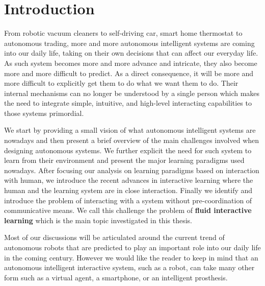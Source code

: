 
\chapter{Introduction}
\label{chapter:introduction}
\minitoc

From robotic vacuum cleaners to self-driving car, smart home thermostat to autonomous trading, more and more autonomous intelligent systems are coming into our daily life, taking on their own decisions that can affect our everyday life. As such system becomes more and more advance and intricate, they also become more and more difficult to predict. As a direct consequence, it will be more and more difficult to explicitly get them to do what we want them to do. Their internal mechanisms can no longer be understood by a single person which makes the need to integrate simple, intuitive, and high-level interacting capabilities to those systems primordial.

We start by providing a small vision of what autonomous intelligent systems are nowadays and then present a brief overview of the main challenges involved when designing autonomous systems. We further explicit the need for such system to learn from their environment and present the major learning paradigms used nowadays. After focusing our analysis on learning paradigms based on interaction with human, we introduce the recent advances in interactive learning where the human and the learning system are in close interaction. Finally we identify and introduce the problem of interacting with a system without pre-coordination of communicative means. We call this challenge the problem of \textbf{fluid interactive learning} which is the main topic investigated in this thesis.

Most of our discussions will be articulated around the current trend of autonomous robots that are predicted to play an important role into our daily life in the coming century. However we would like the reader to keep in mind that an autonomous intelligent interactive system, such as a robot, can take many other form such as a virtual agent, a smartphone, or an intelligent prosthesis.

